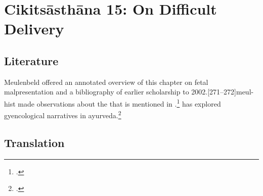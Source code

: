 
\chapter{Cikitsāsthāna 15:  On Difficult Delivery}


\section{Literature} 

Meulenbeld offered an annotated overview of this chapter on fetal
malpresentation and a bibliography of earlier scholarship to
2002.[271--272]{meul-hist}  \citeauthor{das-2003} made 
observations about the  that is mentioned in  
.\footcite[517]{das-2003}   \citeauthor{selb-2005} 
has explored gyencological 
narratives in ayurveda.\footcite{selb-2005,selb-2005b}

\section{Translation}

